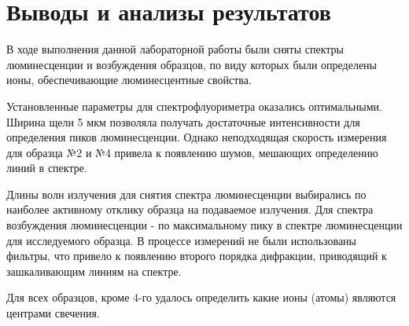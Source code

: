 
\section{Выводы и анализы результатов}\label{sec:conclution}

В ходе выполнения данной лабораторной работы были сняты спектры люминесценции и возбуждения образцов, по виду которых были определены ионы, обеспечивающие люминесцентные свойства.

Установленные параметры для спектрофлуориметра оказались оптимальными.
Ширина щели 5 мкм позволяла получать достаточные интенсивности для определения пиков люминесценции.
Однако неподходящая скорость измерения для образца №2 и №4 привела к появлению шумов, мешающих определению линий в спектре.

Длины волн излучения для снятия спектра люминесценции выбирались по наиболее активному отклику образца на подаваемое излучения.
Для спектра возбуждения люминесценции - по максимальному пику в спектре люминесценции для исследуемого образца.
В процессе измерений не были использованы фильтры, что привело к появлению второго порядка дифракции, приводящий к зашкаливающим линиям на спектре.

Для всех образцов, кроме 4-го удалось определить какие ионы (атомы) являются центрами свечения.

